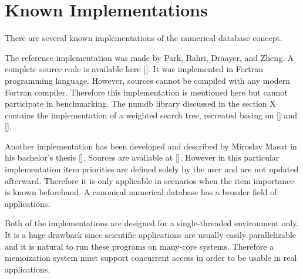 \section{Known Implementations}

There are several known implementations of the numerical database concept.

The reference implementation was made by Park, Bahri, Draayer, and Zheng. A complete source code is available here []. It was implemented in Fortran programming language. However, sources cannot be compiled with any modern Fortran compiler. Therefore this implementation is mentioned here but cannot participate in benchmarking. The numdb library discussed in the section X contains the implementation of a weighted search tree, recreated basing on [] and [].

Another implementation has been developed and described by Miroslav Masat in his bachelor’s thesis []. Sources are available at []. However in this particular implementation item priorities are defined solely by the user and are not updated afterward. Therefore it is only applicable in scenarios when the item importance is known beforehand. A canonical numerical database has a broader field of applications.

Both of the implementations are designed for a single-threaded environment only. It is a huge drawback since scientific applications are usually easily parallelizable and it is natural to run these programs on many-core systems. Therefore a memoization system must support concurrent access in order to be usable in real applications.
